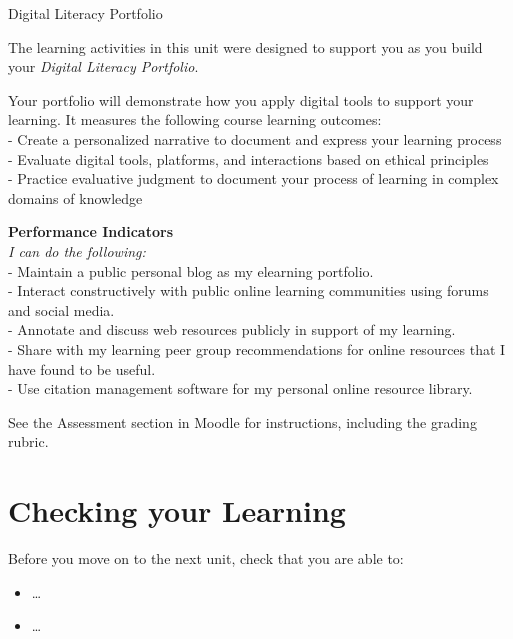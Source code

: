 \documentclass[
]{book}
\providecommand{\tightlist}{%
  \setlength{\itemsep}{0pt}\setlength{\parskip}{0pt}}
\theoremstyle{definition}
\theoremstyle{definition}
\theoremstyle{definition}
\theoremstyle{definition}
\theoremstyle{remark}
\begin{document}
\begin{assessment}
{Digital Literacy Portfolio}

The learning activities in this unit were designed to support you as you build your \emph{Digital Literacy Portfolio}.

Your portfolio will demonstrate how you apply digital tools to support your learning. It measures the following course learning outcomes:\\
- Create a personalized narrative to document and express your learning process\\
- Evaluate digital tools, platforms, and interactions based on ethical principles\\
- Practice evaluative judgment to document your process of learning in complex domains of knowledge

\textbf{Performance Indicators}\\
\emph{I can do the following:}\\
- Maintain a public personal blog as my elearning portfolio.\\
- Interact constructively with public online learning communities using forums and social media.\\
- Annotate and discuss web resources publicly in support of my learning.\\
- Share with my learning peer group recommendations for online resources that I have found to be useful.\\
- Use citation management software for my personal online resource library.

See the Assessment section in Moodle for instructions, including the grading rubric.
\end{assessment}

\hypertarget{checking-your-learning-3}{%
\section*{Checking your Learning}\label{checking-your-learning-3}}

\begin{progress}
Before you move on to the next unit, check that you are able to:

\begin{itemize}
\tightlist
\item
  \ldots{}
\item
  \ldots{}
\end{itemize}
\end{progress}
\end{document}
